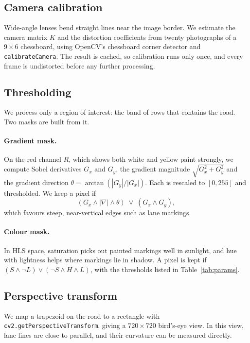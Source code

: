 \documentclass[11pt,a4paper]{article}
\begin{document}
\subsection{Camera calibration}
Wide-angle lenses bend straight lines near the image border. We estimate the camera matrix
$K$ and the distortion coefficients from twenty photographs of a $9\times6$ chessboard,
using OpenCV's chessboard corner detector and \texttt{calibrateCamera}. The result is
cached, so calibration runs only once, and every frame is undistorted before any further
processing.

\subsection{Thresholding}
We process only a region of interest: the band of rows that contains the road. Two masks
are built from it.

\paragraph{Gradient mask.} On the red channel $R$, which shows both white and yellow paint
strongly, we compute Sobel derivatives $G_x$ and $G_y$, the gradient magnitude
$\sqrt{G_x^2+G_y^2}$ and the gradient direction $\theta=\arctan(|G_y|/|G_x|)$. Each is
rescaled to $[0,255]$ and thresholded. We keep a pixel if
\begin{equation}
  (G_x \wedge |\nabla| \wedge \theta) \;\vee\; (G_x \wedge G_y),
\end{equation}
which favours steep, near-vertical edges such as lane markings.

\paragraph{Colour mask.} In HLS space, saturation picks out painted markings well in
sunlight, and hue with lightness helps where markings lie in shadow. A pixel is kept if
$(S \wedge \neg L) \vee (\neg S \wedge H \wedge L)$, with the thresholds listed in
Table~\ref{tab:params}.

\subsection{Perspective transform}
We map a trapezoid on the road to a rectangle with \texttt{cv2.getPerspectiveTransform},
giving a $720\times720$ bird's-eye view. In this view, lane lines are close to parallel,
and their curvature can be measured directly.
\end{document}
